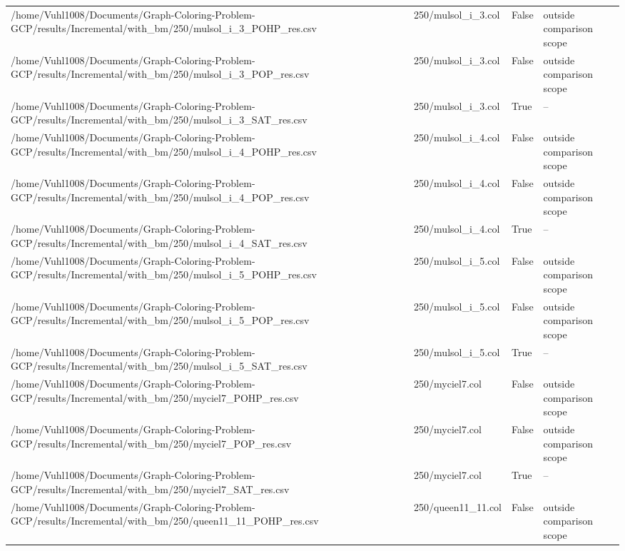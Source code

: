 \begin{table}[htbp]
\begin{tabular}{llll}
/home/Vuhl1008/Documents/Graph-Coloring-Problem-GCP/results/Incremental/with\_bm/250/mulsol\_i\_3\_POHP\_res.csv & 250/mulsol\_i\_3.col & False & outside comparison scope \\
/home/Vuhl1008/Documents/Graph-Coloring-Problem-GCP/results/Incremental/with\_bm/250/mulsol\_i\_3\_POP\_res.csv & 250/mulsol\_i\_3.col & False & outside comparison scope \\
/home/Vuhl1008/Documents/Graph-Coloring-Problem-GCP/results/Incremental/with\_bm/250/mulsol\_i\_3\_SAT\_res.csv & 250/mulsol\_i\_3.col & True & -- \\
/home/Vuhl1008/Documents/Graph-Coloring-Problem-GCP/results/Incremental/with\_bm/250/mulsol\_i\_4\_POHP\_res.csv & 250/mulsol\_i\_4.col & False & outside comparison scope \\
/home/Vuhl1008/Documents/Graph-Coloring-Problem-GCP/results/Incremental/with\_bm/250/mulsol\_i\_4\_POP\_res.csv & 250/mulsol\_i\_4.col & False & outside comparison scope \\
/home/Vuhl1008/Documents/Graph-Coloring-Problem-GCP/results/Incremental/with\_bm/250/mulsol\_i\_4\_SAT\_res.csv & 250/mulsol\_i\_4.col & True & -- \\
/home/Vuhl1008/Documents/Graph-Coloring-Problem-GCP/results/Incremental/with\_bm/250/mulsol\_i\_5\_POHP\_res.csv & 250/mulsol\_i\_5.col & False & outside comparison scope \\
/home/Vuhl1008/Documents/Graph-Coloring-Problem-GCP/results/Incremental/with\_bm/250/mulsol\_i\_5\_POP\_res.csv & 250/mulsol\_i\_5.col & False & outside comparison scope \\
/home/Vuhl1008/Documents/Graph-Coloring-Problem-GCP/results/Incremental/with\_bm/250/mulsol\_i\_5\_SAT\_res.csv & 250/mulsol\_i\_5.col & True & -- \\
/home/Vuhl1008/Documents/Graph-Coloring-Problem-GCP/results/Incremental/with\_bm/250/myciel7\_POHP\_res.csv & 250/myciel7.col & False & outside comparison scope \\
/home/Vuhl1008/Documents/Graph-Coloring-Problem-GCP/results/Incremental/with\_bm/250/myciel7\_POP\_res.csv & 250/myciel7.col & False & outside comparison scope \\
/home/Vuhl1008/Documents/Graph-Coloring-Problem-GCP/results/Incremental/with\_bm/250/myciel7\_SAT\_res.csv & 250/myciel7.col & True & -- \\
/home/Vuhl1008/Documents/Graph-Coloring-Problem-GCP/results/Incremental/with\_bm/250/queen11\_11\_POHP\_res.csv & 250/queen11\_11.col & False & outside comparison scope \\

\end{tabular}
\end{table}
